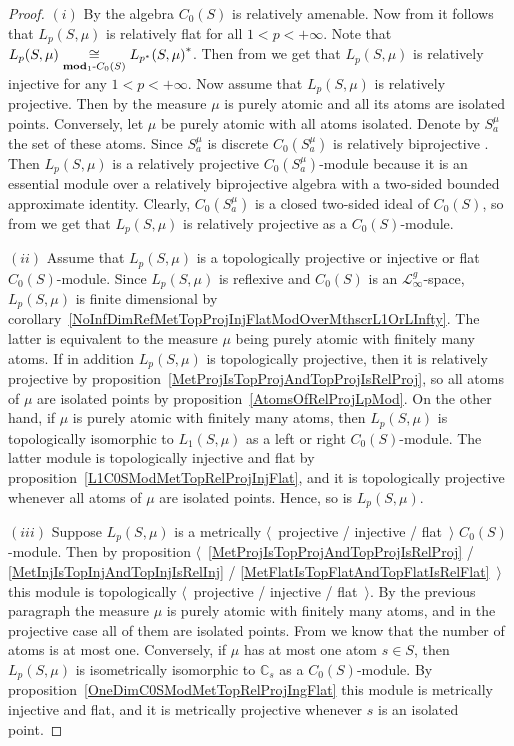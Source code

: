 \begin{proof} $(i)$ By \cite[theorem 7.1.87]{HelBanLocConvAlg} the algebra
$C_0(S)$ is relatively amenable. Now from \cite[theorem 7.1.60]{HelBanLocConvAlg} it follows that $L_p(S,\mu)$ is relatively flat for all $1<p<+\infty$.
Note that $L_p(S,\mu)\mathrel{\mathop{\cong}\limits_{\mathbf{mod}_1\text{-}C_0(S)}}{L_{p^*}(S,\mu)}^*$. Then from
\cite[proposition 7.1.42]{HelBanLocConvAlg} we get that $L_p(S,\mu)$ is
relatively injective for any $1<p<+\infty$. Now assume that $L_p(S,\mu)$ is
relatively projective. Then by \cite[theorem 2]{NemRelProjModLp}
the measure $\mu$ is purely atomic and all its atoms are isolated points.
Conversely, let $\mu$ be purely atomic with all atoms isolated. Denote by
$S_a^{\mu}$ the set of these atoms. Since $S_a^{\mu}$ is discrete
$C_0(S_a^{\mu})$ is relatively biprojective \cite[theorem 4.5.26]{HelHomolBanTopAlg}. Then $L_p(S,\mu)$ is a relatively projective $C_0(S_a^{\mu})$-module
because it is an essential module over a relatively biprojective algebra with
a two-sided bounded approximate identity. Clearly, $C_0(S_a^{\mu})$ is a closed 
two-sided ideal of $C_0(S)$, so 
from \cite[proposition 2.3.2(i)]{RamsHomPropSemgroupAlg}
we get that $L_p(S,\mu)$ is relatively projective as a $C_0(S)$-module.

$(ii)$ Assume that $L_p(S,\mu)$ is a topologically projective
or injective or flat $C_0(S)$-module. Since $L_p(S,\mu)$ is reflexive and
$C_0(S)$ is an $\mathscr{L}_\infty^g$-space, $L_p(S,\mu)$ is finite
dimensional by
corollary~\ref{NoInfDimRefMetTopProjInjFlatModOverMthscrL1OrLInfty}. The latter
is equivalent to the measure $\mu$ being purely atomic with finitely many
atoms. If in addition $L_p(S,\mu)$ is topologically projective, then it is
relatively projective by
proposition~\ref{MetProjIsTopProjAndTopProjIsRelProj}, so all atoms of $\mu$
are isolated points by proposition~\ref{AtomsOfRelProjLpMod}. On the other
hand, if $\mu$ is purely atomic with finitely many atoms, then
$L_p(S,\mu)$ is topologically isomorphic 
to $L_1(S,\mu)$ as a left or right $C_0(S)$-module. The latter module is 
topologically injective and flat by 
proposition~\ref{L1C0SModMetTopRelProjInjFlat}, and it is topologically
projective whenever all atoms of $\mu$ are isolated points. Hence, so
is $L_p(S,\mu)$.

$(iii)$ Suppose $L_p(S,\mu)$ is a metrically $\langle$~projective / injective / 
flat~$\rangle$ $C_0(S)$-module. Then by 
proposition $\langle$~\ref{MetProjIsTopProjAndTopProjIsRelProj} / 
\ref{MetInjIsTopInjAndTopInjIsRelInj} / 
\ref{MetFlatIsTopFlatAndTopFlatIsRelFlat}~$\rangle$ this module is topologically
$\langle$~projective / injective / flat~$\rangle$. By the previous paragraph the
measure $\mu$ is purely atomic with finitely many atoms, and in the projective
case all of them are isolated points.
From \cite[theorem 4.5]{NemMetProjInjFlatModLp} we know that the number of 
atoms is at most one. Conversely, if $\mu$ has at most one atom $s\in S$, 
then $L_p(S,\mu)$ is isometrically isomorphic 
to $\mathbb{C}_s$ as a $C_0(S)$-module. By 
proposition~\ref{OneDimC0SModMetTopRelProjIngFlat} this module is metrically 
injective and flat, and it is metrically projective whenever $s$ is an isolated
point.
\end{proof}

